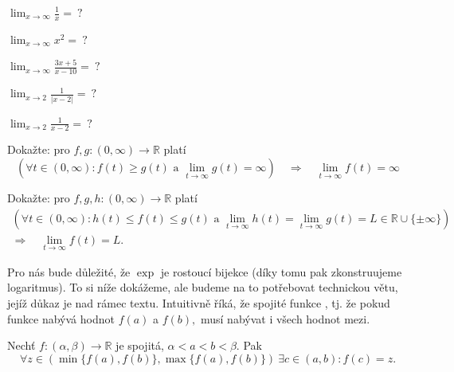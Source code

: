 \begin{úloha}
	$\lim_{x\to \infty}\frac{1}{x}=\ ?$
\end{úloha}

\begin{úloha}
	$\lim_{x\to \infty}x^{2}=\ ?$
\end{úloha}

\begin{úloha}
	$\lim_{x\to \infty}\frac{3x+5}{x-10}=\ ?$
\end{úloha}

\begin{úloha}
	$\lim_{x\to 2}\frac{1}{|x-2|}=\ ?$
\end{úloha}

\begin{úloha}
	$\lim_{x\to 2}\frac{1}{x-2}=\ ?$
\end{úloha}

\begin{úloha} Dokažte: pro $f,g\colon(0,\infty)\to \mathbb{R}$ platí
\begin{equation*}
	\left(\forall t\in (0,\infty)\colon f(t)\geq g(t) \text{ a } \lim_{t\to\infty}g(t)=\infty\right)\quad \Rightarrow\quad \lim_{t\to \infty}f(t)=\infty
\end{equation*}
\end{úloha}
\begin{úloha}\label{ul:veta o dvou straznicich} Dokažte: pro $f,g,h\colon (0,\infty)\to \mathbb{R}$ platí
\begin{align*}
	\left(\forall t\in (0,\infty)\colon h(t)\leq f(t)\leq g(t) \text{ a } \lim_{t\to\infty}h(t)=\lim_{t\to\infty}g(t)=L\in \mathbb{R}\cup\{\pm\infty\}\right) \\
	\Rightarrow\quad \lim_{t\to \infty}f(t)=L.
\end{align*}
\end{úloha}

Pro nás bude důležité, že $\exp$ je rostoucí bijekce (díky tomu pak zkonstruujeme logaritmus). To si níže dokážeme, ale budeme na to potřebovat technickou větu, jejíž důkaz je nad rámec textu. Intuitivně říká, že spojité funkce , tj. že pokud funkce nabývá hodnot $f(a)$ a $f(b),$ musí nabývat i všech hodnot mezi.
\begin{věta*}\label{veta:nabyvani mezihodnot}
  Nechť $f\colon (\alpha,\beta)\to \mathbb{R}$ je spojitá, $\alpha<a<b<\beta.$ Pak
  \begin{equation*}
	  \forall z\in (\min\{f(a),f(b)\},\max\{f(a),f(b)\})\ \exists c\in (a,b)\colon f(c)=z.
  \end{equation*}
\end{věta*}

